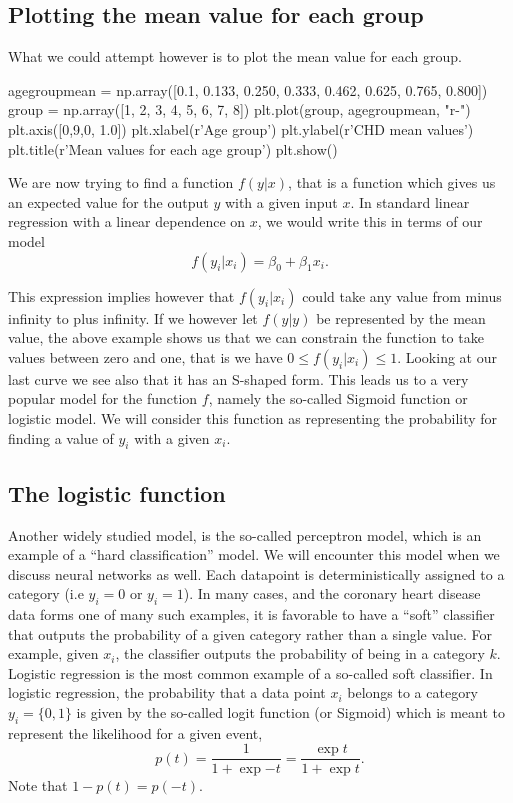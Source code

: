 \documentclass[%
oneside,                 %
final,                   %
10pt]{article}
\begin{document}
\subsection{Plotting the mean value for each group}

What we could attempt however is to plot the mean value for each group.

\bpycod
agegroupmean = np.array([0.1, 0.133, 0.250, 0.333, 0.462, 0.625, 0.765, 0.800])
group = np.array([1, 2, 3, 4, 5, 6, 7, 8])
plt.plot(group, agegroupmean, "r-")
plt.axis([0,9,0, 1.0])
plt.xlabel(r'Age group')
plt.ylabel(r'CHD mean values')
plt.title(r'Mean values for each age group')
plt.show()
\epycod

We are now trying to find a function $f(y\vert x)$, that is a function which gives us an expected value for the output $y$ with a given input $x$.
In standard linear regression with a linear dependence on $x$, we would write this in terms of our model
\[
f(y_i\vert x_i)=\beta_0+\beta_1 x_i.
\]

This expression implies however that $f(y_i\vert x_i)$ could take any
value from minus infinity to plus infinity. If we however let
$f(y\vert y)$ be represented by the mean value, the above example
shows us that we can constrain the function to take values between
zero and one, that is we have $0 \le f(y_i\vert x_i) \le 1$. Looking
at our last curve we see also that it has an S-shaped form. This leads
us to a very popular model for the function $f$, namely the so-called
Sigmoid function or logistic model. We will consider this function as
representing the probability for finding a value of $y_i$ with a given
$x_i$.

\subsection{The logistic function}

Another widely studied model, is the so-called 
perceptron model, which is an example of a ``hard classification'' model. We
will encounter this model when we discuss neural networks as
well. Each datapoint is deterministically assigned to a category (i.e
$y_i=0$ or $y_i=1$). In many cases, and the coronary heart disease data forms one of many such examples, it is favorable to have a ``soft''
classifier that outputs the probability of a given category rather
than a single value. For example, given $x_i$, the classifier
outputs the probability of being in a category $k$.  Logistic regression
is the most common example of a so-called soft classifier. In logistic
regression, the probability that a data point $x_i$
belongs to a category $y_i=\{0,1\}$ is given by the so-called logit function (or Sigmoid) which is meant to represent the likelihood for a given event, 
\[
p(t) = \frac{1}{1+\mathrm \exp{-t}}=\frac{\exp{t}}{1+\mathrm \exp{t}}.
\]
Note that $1-p(t)= p(-t)$.
\end{document}
